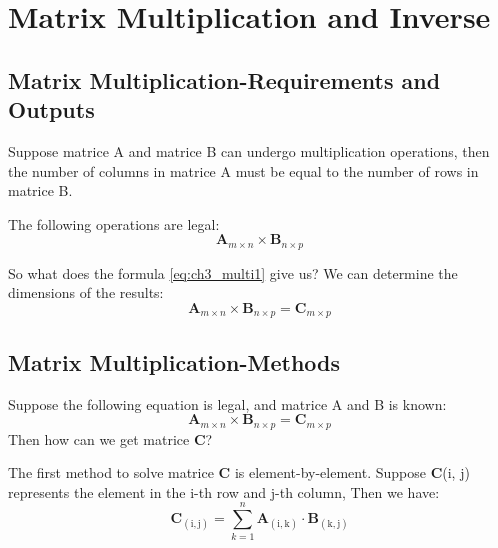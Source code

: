 \section{Matrix Multiplication and Inverse}
    \subsection{Matrix Multiplication-Requirements and Outputs}
    Suppose matrice A and matrice B can undergo multiplication operations, 
    then the number of columns in matrice A must be equal to the number of rows in matrice B.
    
    The following operations are legal:
        \begin{equation} \label{eq:ch3_multi1}
            \mathbf{A}_{m\times n} \times \mathbf{B}_{n\times p}
        \end{equation}
    
    So what does the formula \eqref{eq:ch3_multi1} give us? We can determine the dimensions of the results:
        \begin{equation} \label{eq:ch3_multi2}
            \mathbf{A}_{m\times n} \times \mathbf{B}_{n\times p} = \mathbf{C}_{m \times p}
        \end{equation}
    
    \subsection{Matrix Multiplication-Methods}
        Suppose the following equation is legal, and matrice A and B is known:
            \begin{equation} 
            \mathbf{A}_{m\times n} \times \mathbf{B}_{n\times p} = \mathbf{C}_{m \times p}
        \end{equation}
        Then how can we get matrice \textbf{C}?

        The first method to solve matrice \textbf{C} is element-by-element. 
        Suppose \textbf{C}(i, j) represents the element in the i-th row and j-th column,
        Then we have:
            \begin{equation}
                \mathbf{C}_\mathrm{(i,j)} = \sum_{k=1}^n \mathbf{A}_\mathrm{(i,k)} \cdot \mathbf{B}_\mathrm{(k,j)}
            \end{equation}
    
